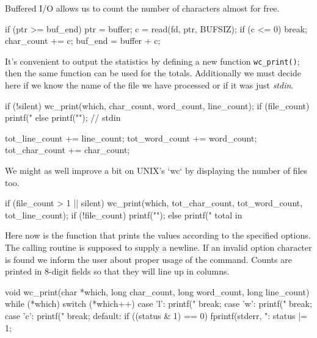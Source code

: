 \documentclass[11pt,a4paper]{article}
\begin{document}
Buffered I/O allows us to count the number of characters almost for free.

\begin{code}[language=c,name={Fill buffer if it is empty; break at end of file}]
if (ptr >= buf_end) {
    ptr = buffer;
    c = read(fd, ptr, BUFSIZ);
    if (c <= 0) break;
    char_count += c;
    buf_end = buffer + c;
}
\end{code}

It's convenient to output the statistics by defining a new function \texttt{wc\_print()}; then the same
function can be used for the totals. Additionally we must decide here if we know the name of the
file we have processed or if it was just \emph{stdin}.

\begin{code}[language=c,name={Write statistics for file}]
if (!silent) {
    wc_print(which, char_count, word_count, line_count);
    if (file_count) printf(" %
    else printf("\n");                       // stdin
}
\end{code}

\begin{code}[language=c,name={Update grand totals}]
tot_line_count += line_count;
tot_word_count += word_count;
tot_char_count += char_count;
\end{code}

We might as well improve a bit on UNIX's `wc` by displaying the number of files too.

\begin{code}[language=c,name={Print the grand totals if there were multiple files}]
if (file_count > 1 || silent) {
    wc_print(which, tot_char_count, tot_word_count, tot_line_count);
    if (!file_count) printf("\n");
    else printf(" total in %
}
\end{code}

Here now is the function that prints the values according to the specified options. The calling
routine is supposed to supply a newline. If an invalid option character is found we inform the user
about proper usage of the command. Counts are printed in 8-digit fields so that they will line up in
columns.

\begin{code}[language=c,name={Functions}]
void wc_print(char *which, long char_count, long word_count, long line_count)
{
    while (*which)
        switch (*which++) {
        case 'l': printf("%
            break;
        case 'w': printf("%
            break;
        case 'c': printf("%
            break;
        default:
            if ((status & 1) == 0) {
                fprintf(stderr, "\nUsage: %
                status |= 1;
            }
        }
}
\end{code}
\end{document}
